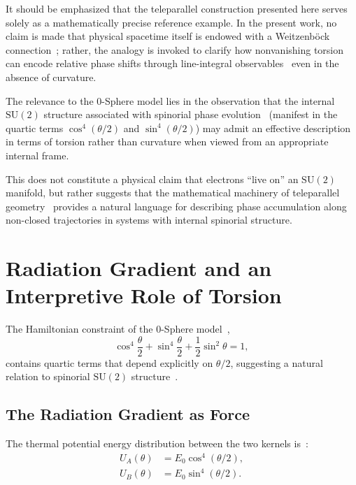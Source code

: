 \documentclass[12pt,letterpaper]{article}
\begin{document}
It should be emphasized that the teleparallel construction presented here serves solely as a mathematically precise reference example. In the present work, no claim is made that physical spacetime itself is endowed with a Weitzenb\"{o}ck connection~\cite{Weitzenbock1923}; rather, the analogy is invoked to clarify how nonvanishing torsion can encode relative phase shifts through line-integral observables~\cite{hanamura18203433} even in the absence of curvature.

The relevance to the 0-Sphere model lies in the observation that the internal $\mathrm{SU}(2)$ structure associated with spinorial phase evolution~\cite{hanamura18067760} (manifest in the quartic terms $\cos^4(\theta/2)$ and $\sin^4(\theta/2)$) may admit an effective description in terms of torsion rather than curvature when viewed from an appropriate internal frame.

This does not constitute a physical claim that electrons ``live on'' an $\mathrm{SU}(2)$ manifold, but rather suggests that the mathematical machinery of teleparallel geometry~\cite{Aldrovandi2013} provides a natural language for describing phase accumulation along non-closed trajectories in systems with internal spinorial structure.


\section{Radiation Gradient and an Interpretive Role of Torsion}

\justifying
The Hamiltonian constraint of the 0-Sphere model~\cite{hanamura16759284,hanamura17765017},
\begin{equation}
\cos^{4} \frac{\theta}{2} + \sin^{4} \frac{\theta}{2} + \frac{1}{2}\sin^{2} \theta = 1,
\end{equation}
contains quartic terms that depend explicitly on $\theta/2$, suggesting a natural relation to spinorial $\mathrm{SU}(2)$ structure~\cite{hanamura18067760}.

\subsection{The Radiation Gradient as Force}

The thermal potential energy distribution between the two kernels is~\cite{hanamura16759284,hanamura18356895}:
\begin{align}
U_A(\theta) &= E_0 \cos^4(\theta/2), \\
U_B(\theta) &= E_0 \sin^4(\theta/2).
\end{align}
\end{document}
